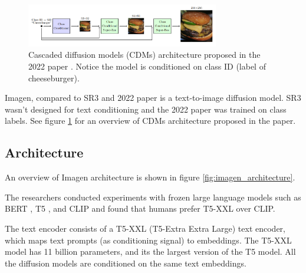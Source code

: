 \begin{figure}
    \centering
    \includegraphics[width=0.75\textwidth]{images/imagen/cdm_architecture.png}
    \caption{Cascaded diffusion models (CDMs) architecture proposed in the 2022 paper \cite{cascaded_diffusion_models}. Notice the model is conditioned on class ID (label of cheeseburger).}
    \label{fig:imagen_cdm_architecture}
\end{figure}

Imagen, compared to SR3 \cite{sr3} and 2022 paper \cite{cascaded_diffusion_models} is a text-to-image diffusion model. SR3 wasn't designed for text conditioning and the 2022 paper \cite{cascaded_diffusion_models} was trained on class labels. See figure \ref{fig:imagen_cdm_architecture} for an overview of CDMs architecture proposed in the paper.

































\subsection{Architecture}

An overview of Imagen architecture is shown in figure \ref{fig:imagen_architecture}.

The researchers conducted experiments with frozen large language models such as BERT \cite{bert}, T5 \cite{t5_model}, and CLIP \cite{openai_clip} and found that humans prefer T5-XXL over CLIP.

The text encoder consists of a T5-XXL (T5-Extra Extra Large) text encoder, which maps text prompts (as conditioning signal) to embeddings. The T5-XXL model has 11 billion parameters, and its the largest version of the T5 model. All the diffusion models are conditioned on the same text embeddings.

